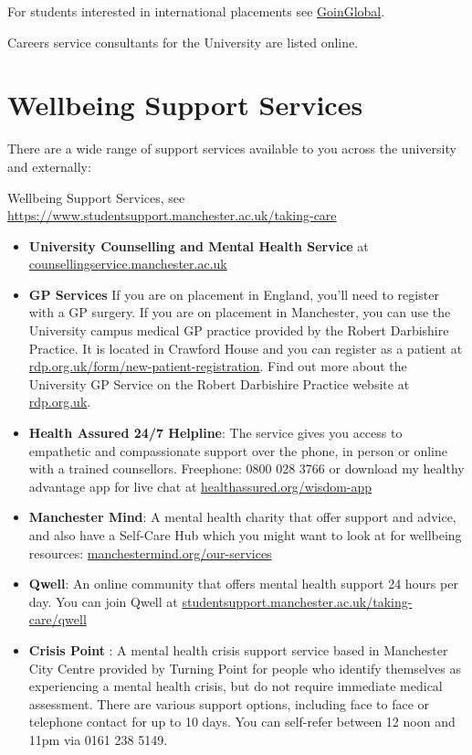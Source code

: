 \documentclass[
]{book}
\providecommand{\tightlist}{%
  \setlength{\itemsep}{0pt}\setlength{\parskip}{0pt}}
\begin{document}
For students interested in international placements see \href{https://www.careers.manchester.ac.uk/international/goinglobal/}{GoinGlobal}. \citep{goinglobal}

Careers service consultants for the University are listed online. \citep{consultants}

\section{Wellbeing Support Services}\label{wellbeing}

There are a wide range of support services available to you across the university and externally:

Wellbeing Support Services, see \href{https://www.studentsupport.manchester.ac.uk/taking-care/}{https://www.studentsupport.manchester.ac.uk/taking-care} \citep{wellbeing}

\begin{itemize}
\tightlist
\item
  \textbf{University Counselling and Mental Health Service} at \href{https://www.counsellingservice.manchester.ac.uk/}{counsellingservice.manchester.ac.uk} \citep{counselling}
\item
  \textbf{GP Services} If you are on placement in England, you'll need to register with a GP surgery. \citep{registerNHS} If you are on placement in Manchester, you can use the University campus medical GP practice provided by the Robert Darbishire Practice. It is located in Crawford House and you can register as a patient at \href{https://rdp.org.uk/form/new-patient-registration/}{rdp.org.uk/form/new-patient-registration}. Find out more about the University GP Service on the Robert Darbishire Practice website at \href{https://rdp.org.uk}{rdp.org.uk}.\citep{darbishire}
\item
  \textbf{Health Assured 24/7 Helpline}: The service gives you access to empathetic and compassionate support over the phone, in person or online with a trained counsellors. Freephone: 0800 028 3766 or download my healthy advantage app for live chat at \href{https://www.healthassured.org/wisdom-app/}{healthassured.org/wisdom-app}
\item
  \textbf{Manchester Mind}: A mental health charity that offer support and advice, and also have a Self-Care Hub which you might want to look at for wellbeing resources: \href{https://www.manchestermind.org/our-services/}{manchestermind.org/our-services} \citep{manchestermind}
\item
  \textbf{Qwell}: An online community that offers mental health support 24 hours per day. You can join Qwell
  at \href{https://www.studentsupport.manchester.ac.uk/taking-care/qwell/}{studentsupport.manchester.ac.uk/taking-care/qwell} \citep{qwell}
\item
  \textbf{Crisis Point} : A mental health crisis support service based in Manchester City Centre provided by Turning Point for people who identify themselves as experiencing a mental health crisis, but do not require immediate medical assessment. There are various support options, including face to face or telephone contact for up to 10 days. You can self-refer between 12 noon and 11pm via 0161 238 5149.
\end{itemize}
\end{document}
